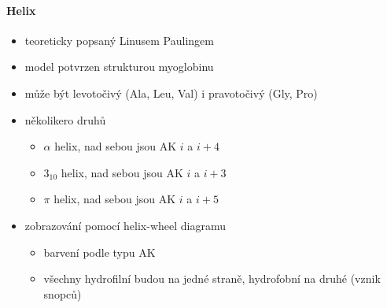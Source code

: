 \documentclass[DIV=8]{scrreprt}
\begin{document}
\paragraph{Helix}
\begin{itemize}[nosep]
    \item teoreticky popsaný Linusem Paulingem
    \item model potvrzen strukturou myoglobinu
    \item může být levotočivý (Ala, Leu, Val) i pravotočivý (Gly, Pro)
    \item několikero druhů
\begin{itemize}[nosep]
    \item \(\alpha\) helix, nad sebou jsou AK \(i\) a \(i + 4\)
    \item \(3_{10}\) helix, nad sebou jsou AK \(i\) a \(i + 3\)
    \item \(\pi\) helix, nad sebou jsou AK \(i\) a \(i + 5\)
\end{itemize}

    \item zobrazování pomocí helix-wheel diagramu
\begin{itemize}[nosep]
    \item barvení podle typu AK
    \item všechny hydrofilní budou na jedné straně, hydrofobní na druhé (vznik snopců)
\end{itemize}

\end{itemize}
\end{document}
